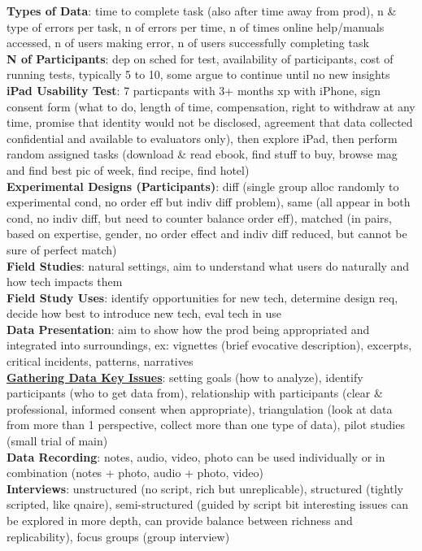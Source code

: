 \documentclass[a4paper]{article}
\begin{document}
\begin{multicols}{3}
        \textbf{Types of Data}: time to complete task (also after time away from prod), n \& type of errors per task, n of errors per time, n of times online help/manuals accessed, n of users making error, n of users successfully completing task\\
        \textbf{N of Participants}: dep on sched for test, availability of participants, cost of running tests, typically 5 to 10, some argue to continue until no new insights\\
        \textbf{iPad Usability Test}: 7 particpants with 3+ months xp with iPhone, sign consent form (what to do, length of time, compensation, right to withdraw at any time, promise that identity would not be disclosed, agreement that data collected confidential and available to evaluators only), then explore iPad, then perform random assigned tasks (download \& read ebook, find stuff to buy, browse mag and find best pic of week, find recipe, find hotel)\\
        \textbf{Experimental Designs (Participants)}: diff (single group alloc randomly to experimental cond, no order eff but indiv diff problem), same (all appear in both cond, no indiv diff, but need to counter balance order eff), matched (in pairs, based on expertise, gender, no order effect and indiv diff reduced, but cannot be sure of perfect match)\\
        \textbf{Field Studies}: natural settings, aim to understand what users do naturally and how tech impacts them\\
        \textbf{Field Study Uses}: identify opportunities for new tech, determine design req, decide how best to introduce new tech, eval tech in use\\
        \textbf{Data Presentation}: aim to show how the prod being appropriated and integrated into surroundings, ex: vignettes (brief evocative description), excerpts, critical incidents, patterns, narratives\\
        \underline{\textbf{Gathering Data Key Issues}}: setting goals (how to analyze), identify participants (who to get data from), relationship with participants (clear \& professional, informed consent when appropriate), triangulation (look at data from more than 1 perspective, collect more than one type of data), pilot studies (small trial of main)\\
        \textbf{Data Recording}: notes, audio, video, photo can be used individually or in combination (notes + photo, audio + photo, video)\\
        \textbf{Interviews}: unstructured (no script, rich but unreplicable), structured (tightly scripted, like qnaire), semi-structured (guided by script bit interesting issues can be explored in more depth, can provide balance between richness and replicability), focus groups (group interview)\\

\end{multicols}
\end{document}
